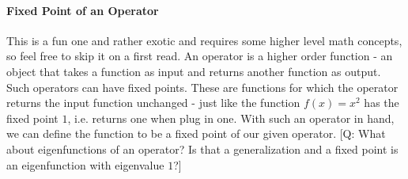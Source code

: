 


\paragraph{Fixed Point of an Operator}
This is a fun one and rather exotic and requires some higher level math concepts, so feel free to skip it on a first read. An operator is a higher order function - an object that takes a function as input and returns another function as output. Such operators can have fixed points. These are functions for which the operator returns the input function unchanged - just like the function $f(x) = x^2$ has the fixed point $1$, i.e. returns one when plug in one. With such an operator in hand, we can define the function to be a fixed point of our given operator. [Q: What about eigenfunctions of an operator? Is that a generalization and a fixed point is an eigenfunction with eigenvalue $1$?]


